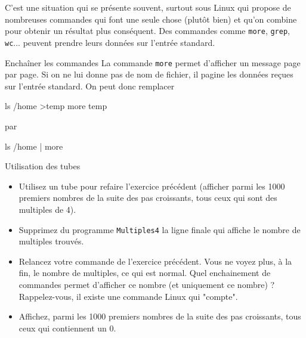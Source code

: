 \documentclass[a4paper,11pt]{article}
\begin{document}
			C'est une situation qui se pr\'esente souvent, surtout sous Linux qui
			propose de nombreuses commandes qui font une seule chose (plut\^ot
			bien) et qu'on combine pour obtenir un r\'esultat plus cons\'equent.
			Des commandes comme \verb_more_, \verb_grep_, \verb_wc_... peuvent
			prendre leurs donn\'ees sur l'entr\'ee standard.
					
          
		\begin{Exemple}{Enchaîner les commandes} 
			La commande \verb_more_ permet d'afficher un message page par page.
			Si on ne lui donne pas de nom de fichier, il pagine les donn\'ees re\c cues sur l'entr\'ee standard. 
			On peut donc remplacer
				
                  	 \begin{Console}
				ls /home >temp
				more temp
			\end{Console}
					par
				
                		 \begin{Console}
				ls /home | more
			\end{Console}
			
		\end{Exemple}
			
		\begin{Exercice}{Utilisation des tubes}
				\begin{itemize}
				
						\item Utilisez un tube pour refaire l'exercice pr\'ec\'edent
						(afficher parmi les 1000 premiers nombres de la suite des pas croissants,
						tous ceux qui sont des multiples de 4).
					
						\item Supprimez du programme \verb_Multiples4_
							la ligne finale qui affiche le nombre de multiples trouv\'es. 
					
						\item Relancez votre commande de l'exercice pr\'ec\'edent.
							Vous ne voyez plus, \`a la fin, le nombre de multiples, ce qui est normal.
							Quel enchainement de commandes permet d'afficher ce nombre
							(et uniquement ce nombre) ? Rappelez-vous, il existe une commande Linux qui "compte". 
					
						\item Affichez, parmi les 1000 premiers nombres 
							de la suite des pas croissants, tous ceux qui contiennent un 0.
					
					\end{itemize}
	\end{Exercice}
\end{document}
